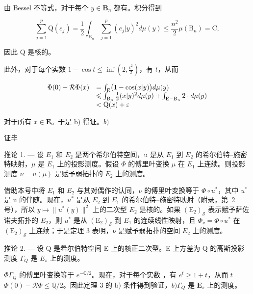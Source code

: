 由 Bessel 不等式，对于每个 \(y \in \mathbf{B}_n\) 都有。积分得到

\[
\sum_ {j = 1} ^ {p} \mathrm{Q} (e _ {j}) = \frac {1}{2} \int_ {\mathrm{B} _ {n}} \sum_ {j = 1} ^ {p} (e _ {j} | y) ^ {2} d \mu (y) \leqslant \frac {n ^ {2}}{2} \mu (\mathrm{B} _ {n}) = \mathrm{C},
\]

因此 Q 是核的。

此外，对于每个实数 \(1 - \cos t \leqslant \inf \left(2, \frac{t^2}{2}\right)\)，有 \(t\)，从而

\[
\begin{array}{r l} \Phi (0) - \mathcal {R} \Phi (x) & = \int_ {\mathrm{E}} \bigl (1 - \cos (x | y) \bigr) d \mu (y) \\ & \leqslant \int_ {\mathrm{B} _ {n}} \frac {1}{2} (x | y) ^ {2} d \mu (y) + \int_ {\mathrm{E} - \mathrm{B} _ {n}} 2 \cdot d \mu (y) \\ & <   \mathrm{Q} (x) + \varepsilon \end{array}
\]

对于所有 \(x \in \mathbf{E}\)。于是 b) 得证。\(b)\)

证毕

推论 1. --- 设 \(E_{1}\) 和 \(E_{2}\) 是两个希尔伯特空间，u 是从 \(E_{1}\) 到 \(E_{2}\) 的希尔伯特--施密特映射，\(\mu\) 是 \(E_{1}\) 上的投影测度。假设 \(\Phi\) 的傅里叶变换 \(\mu\) 在 \(E_{1}\) 上连续。则投影测度 \(\nu = u(\mu)\) 是赋予弱拓扑的 \(E_{2}\) 上的测度。

借助本号中将 \(E_{1}\) 和 \(E_{2}\) 与其对偶作的认同，\(\nu\) 的傅里叶变换等于 \(\Phi\circ u^{*}\)，其中 \(u^{*}\) 是 u 的伴随。现在，\(u^{*}\) 是从 \(E_{2}\) 到 \(E_{1}\) 的希尔伯特--施密特映射（附录，第~2号），所以 \(y\mapsto\|u^{*}(y)\|^{2}\) 上的二次型 \(E_{2}\) 是核的。如果 \((\mathrm{E}_{2})_{\mathcal{S}}\) 表示赋予萨佐诺夫拓扑的 \(E_{2}\)，则 \(u^{*}\) 是从 \((\mathrm{E}_{2})_{\mathcal{S}}\) 到 \(E_{1}\) 的连续线性映射，且 \(\Phi_{\nu}=\Phi\circ u^{*}\) 在 \((\mathrm{E}_{2})_{\mathcal{S}}\) 上连续；于是定理 3 表明，\(\nu\) 是赋予弱拓扑的空间 \(E_{2}\) 上的测度。

推论 2. --- 设 Q 是希尔伯特空间 E 上的核正二次型。E 上方差为 Q 的高斯投影测度 \(\Gamma_{Q}\) 是 \(E_{s}\) 上的测度。

 \(\Phi\)\(\Gamma_{Q}\) 的傅里叶变换等于 \(e^{-\mathbb{Q} / 2}\)。现在，对于每个实数 ，有 \(e^t \geqslant 1 + t\)，从而 \(t\)\(\Phi(0) - \mathcal{R}\Phi \leqslant \mathbb{Q} / 2\)。因此定理 3 的 b) 条件得到验证，\(b)\)\(\Gamma_{Q}\) 是 \(\mathbf{E}_s\) 上的测度。

